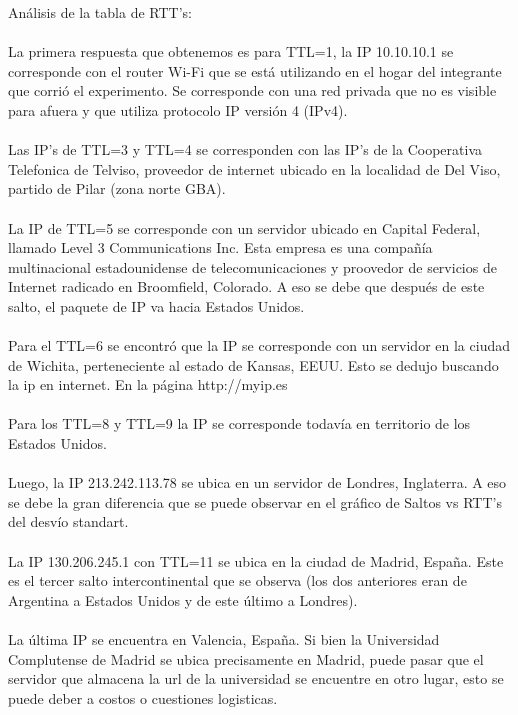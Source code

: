 Análisis de la tabla de RTT's: \\ \\

La primera respuesta que obtenemos es para TTL=1, la IP 10.10.10.1 se corresponde con el router Wi-Fi que se está utilizando en el hogar del 
integrante que corrió el experimento. Se corresponde con una red privada que no es visible para afuera y que utiliza protocolo IP versión 4 (IPv4). \\ \\

Las IP's de TTL=3 y TTL=4 se corresponden con las IP's de la Cooperativa Telefonica de Telviso, proveedor de internet ubicado en 
la localidad de Del Viso, partido de Pilar (zona norte GBA). \\ \\

La IP de TTL=5 se corresponde con un servidor ubicado en Capital Federal, llamado Level 3 Communications Inc. Esta empresa es una 
compañía multinacional estadounidense de telecomunicaciones y proovedor de servicios de Internet radicado en Broomfield, Colorado. A eso se debe que  
después de este salto, el paquete de IP va hacia Estados Unidos.  \\ \\

Para el TTL=6 se encontró que la IP se corresponde con un servidor en la ciudad de Wichita, perteneciente al estado de Kansas, EEUU. 
Esto se dedujo buscando la ip en internet. En la página http://myip.es\\ \\

Para los TTL=8 y TTL=9 la IP se corresponde todavía en territorio de los Estados Unidos. \\ \\

Luego, la IP 213.242.113.78 se ubica en un servidor de Londres, Inglaterra. A eso se debe la gran diferencia que se puede observar en el 
gráfico de Saltos vs RTT's del desvío standart. \\ \\

La IP 130.206.245.1 con TTL=11 se ubica en la ciudad de Madrid, España. Este es el tercer salto intercontinental que se observa 
(los dos anteriores eran de Argentina a Estados Unidos y de este último a Londres). \\ \\

La última IP se encuentra en Valencia, España. Si bien la Universidad Complutense de Madrid se ubica precisamente en Madrid, 
puede pasar que el servidor que almacena la url de la universidad se encuentre en otro lugar, esto se puede deber a costos o cuestiones logisticas.\\ \\ \\


